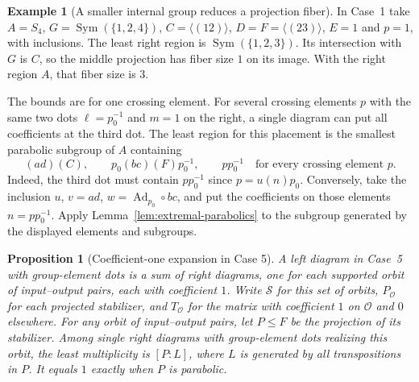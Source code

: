 \documentclass[11pt,a4paper]{article}
\numberwithin{equation}{section}
\newtheorem{proposition}[theorem]{Proposition}
\theoremstyle{definition}
\newtheorem{example}{Example}[section]
\begin{document}
\begin{example}[A smaller internal group reduces a projection fiber]\label{ex:case-one-parabolic-index}
In Case~1 take \(A=S_4\), \(G=\operatorname{Sym}(\{1,2,4\})\),
\(C=\langle(12)\rangle\), \(D=F=\langle(23)\rangle\), \(E=1\)
and \(p=1\), with inclusions. The least right region is
\(\operatorname{Sym}(\{1,2,3\})\). Its intersection with \(G\) is
\(C\), so the middle projection has fiber size \(1\) on its image.
With the right region \(A\), that fiber size is \(3\).
\end{example}

The bounds are for one crossing element. For several crossing elements \(p\) with the
same two dots \(\ell=p_0^{-1}\) and \(m=1\) on the right, a single
diagram can put all coefficients at the third dot. The least
region for this placement is the smallest parabolic subgroup of
\(A\) containing
\[
 (ad)(C),\qquad p_0(bc)(F)p_0^{-1},\qquad pp_0^{-1}
 \quad\text{for every crossing element \(p\)}.
\]
Indeed, the third dot must contain \(pp_0^{-1}\) since
\(p=u(n)p_0\). Conversely, take the inclusion \(u\),
\(v=ad\), \(w=\operatorname{Ad}_{p_0}\circ bc\), and put the
coefficients on those elements \(n=pp_0^{-1}\).
Apply Lemma~\ref{lem:extremal-parabolics} to the subgroup
generated by the displayed elements and subgroups.

\begin{proposition}[Coefficient-one expansion in Case 5]\label{prop:parabolic-three-unscaled}
A left diagram in Case~5 with group-element dots is a sum of
right diagrams, one for each supported orbit of input--output
pairs, each with coefficient \(1\). Write \(\mathcal S\) for this
set of orbits, \(P_{\mathcal O}\) for each projected stabilizer, and
\(T_{\mathcal O}\) for the matrix with coefficient \(1\) on \(\mathcal O\) and
\(0\) elsewhere.
For any orbit of input--output pairs, let \(P\le F\) be the
projection of its stabilizer. Among single right diagrams with
group-element dots realizing this orbit, the least multiplicity
is \([P:L]\), where \(L\) is generated by all transpositions in \(P\).
It equals \(1\) exactly when \(P\) is parabolic.
\end{proposition}
\end{document}
